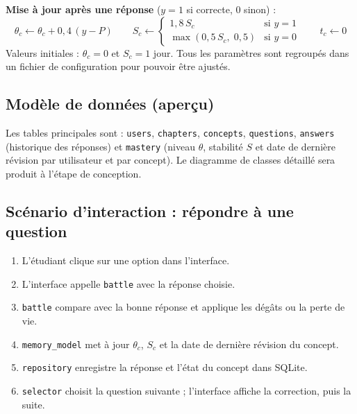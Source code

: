 \documentclass[11pt,a4paper]{article}
\begin{document}
\textbf{Mise \`a jour apr\`es une r\'eponse} ($y = 1$ si correcte, $0$ sinon) :
\[
\theta_c \leftarrow \theta_c + 0{,}4\,(y - P)
\qquad
S_c \leftarrow
\begin{cases}
1{,}8\,S_c & \text{si } y = 1\\
\max(0{,}5\,S_c,\;0{,}5) & \text{si } y = 0
\end{cases}
\qquad
t_c \leftarrow 0
\]
Valeurs initiales : $\theta_c = 0$ et $S_c = 1$ jour. Tous les param\`etres sont regroup\'es dans un fichier de configuration pour pouvoir \^etre ajust\'es.

\subsection{Mod\`ele de donn\'ees (aper\c{c}u)}
Les tables principales sont : \texttt{users}, \texttt{chapters}, \texttt{concepts}, \texttt{questions}, \texttt{answers} (historique des r\'eponses) et \texttt{mastery} (niveau $\theta$, stabilit\'e $S$ et date de derni\`ere r\'evision par utilisateur et par concept). Le diagramme de classes d\'etaill\'e sera produit \`a l'\'etape de conception.

\subsection{Sc\'enario d'interaction : r\'epondre \`a une question}
\begin{enumerate}
  \item L'\'etudiant clique sur une option dans l'interface.
  \item L'interface appelle \texttt{battle} avec la r\'eponse choisie.
  \item \texttt{battle} compare avec la bonne r\'eponse et applique les d\'egâts ou la perte de vie.
  \item \texttt{memory\_model} met \`a jour $\theta_c$, $S_c$ et la date de derni\`ere r\'evision du concept.
  \item \texttt{repository} enregistre la r\'eponse et l'\'etat du concept dans SQLite.
  \item \texttt{selector} choisit la question suivante ; l'interface affiche la correction, puis la suite.
\end{enumerate}
\end{document}
